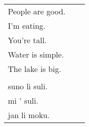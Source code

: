\begin{supertabular}{p{5cm}|ll}
People are good. && \\ %
I'm eating. &&  \\ %
You're tall. &&  \\ %
Water is simple. &&  \\ %
The lake is big. &&\\ %
 && \\
suno li suli. &&  \\%
mi ' suli. &&  \\%
jan li moku. &&  \\%
\end{supertabular} \\%
%

